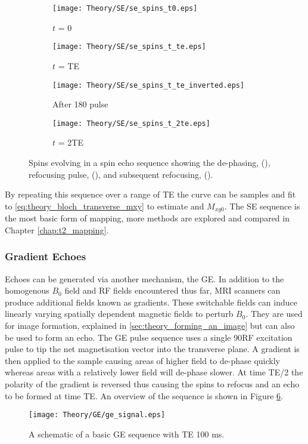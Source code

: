 \begin{figure}[H]
	\centering
	\begin{subfigure}[c]{0.24\textwidth}
		\centering
		\texttt{[image: Theory/SE/se\_spins\_t0.eps]}
		\caption{$t$ = 0}
		\label{fig:theory_se_spins_t0}
	\end{subfigure}
	\hfill
	\begin{subfigure}[c]{0.24\textwidth}
		\centering
		\texttt{[image: Theory/SE/se\_spins\_t\_te.eps]}
		\caption{$t$ = TE}
		\label{fig:theory_se_spins_t_te_by_2}
	\end{subfigure}
	\begin{subfigure}[c]{0.24\textwidth}
		\centering
		\texttt{[image: Theory/SE/se\_spins\_t\_te\_inverted.eps]}
		\caption{After 180\degree{ } pulse}
		\label{fig:theory_se_spins_t_te_by_2_inverted}
	\end{subfigure}
	\begin{subfigure}[c]{0.24\textwidth}
		\centering
		\texttt{[image: Theory/SE/se\_spins\_t\_2te.eps]}
		\caption{$t$ = 2TE}
		\label{fig:theory_se_spins_t_te}
	\end{subfigure}
	\caption{Spins evolving in a spin echo sequence showing the de-phasing, (), refocusing pulse, (), and subsequent refocusing, ().}
	\label{fig:theory_se_spins}
\end{figure}

By repeating this sequence over a range of \ac{TE} the \ttwo curve can be samples and fit to \eqref{eq:theory_bloch_transverse_mxy} to estimate \ttwo and $M_{xy0}$. The \ac{SE} sequence is the most basic form of \ttwo mapping, more methods are explored and compared in Chapter \ref{chap:t2_mapping}.

\subsubsection{Gradient Echoes}
Echoes can be generated via another mechanism, the \ac{GE}. In addition to the homogenous $B_0$ field and \ac{RF} fields encountered thus far, \ac{MRI} scanners can produce additional fields known as gradients. These switchable fields can induce linearly varying spatially dependent magnetic fields to perturb $B_0$. They are used for image formation, explained in \ref{sec:theory_forming_an_image} but can also be used to form an echo. The \ac{GE} pulse sequence uses a single 90\degree{ }\ac{RF} excitation pulse to tip the net magnetisation vector into the transverse plane. A gradient is then applied to the sample causing areas of higher field to de-phase quickly whereas areas with a relatively lower field will de-phase slower. At time \ac{TE}/2 the polarity of the gradient is reversed thus causing the spins to refocus and an echo to be formed at time \ac{TE}. An overview of the sequence is shown in Figure \ref{fig:theory_ge_signal}.
\begin{figure}[H]
	\centering
	\texttt{[image: Theory/GE/ge\_signal.eps]}
	\caption{A schematic of a basic \acf{GE} sequence with \ac{TE} 100 ms.}
	\label{fig:theory_ge_signal}	
\end{figure}

